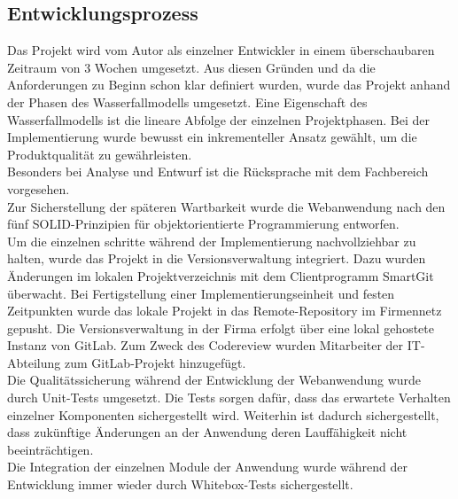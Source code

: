 \subsection{Entwicklungsprozess}
\label{sec:Entwicklungsprozess}
Das Projekt wird vom Autor als einzelner Entwickler in einem überschaubaren Zeitraum 
von 3 Wochen umgesetzt. Aus diesen Gründen und da die Anforderungen zu Beginn schon
klar definiert wurden, wurde das Projekt anhand der Phasen des Wasserfallmodells umgesetzt. 
Eine Eigenschaft des Wasserfallmodells ist die lineare Abfolge der einzelnen Projektphasen.
Bei der Implementierung wurde bewusst ein inkrementeller Ansatz gewählt, um die Produktqualität
zu gewährleisten.\\
Besonders bei Analyse und Entwurf ist die Rücksprache mit dem Fachbereich
vorgesehen.\\
Zur Sicherstellung der späteren Wartbarkeit wurde die Webanwendung nach den fünf SOLID-Prinzipien
für objektorientierte Programmierung entworfen.\\ 
Um die einzelnen schritte während der Implementierung nachvollziehbar zu halten,
wurde das Projekt in die Versionsverwaltung integriert.
Dazu wurden Änderungen im lokalen Projektverzeichnis mit dem Clientprogramm SmartGit überwacht.
Bei Fertigstellung einer Implementierungseinheit und festen Zeitpunkten wurde das lokale Projekt in das 
Remote-Repository im Firmennetz gepusht. Die Versionsverwaltung in der Firma erfolgt über eine lokal gehostete Instanz
von GitLab. Zum Zweck des Codereview wurden Mitarbeiter der IT-Abteilung zum GitLab-Projekt hinzugefügt.\\
Die Qualitätssicherung während der Entwicklung der Webanwendung wurde durch Unit-Tests umgesetzt. Die Tests 
sorgen dafür, dass das erwartete Verhalten einzelner Komponenten sichergestellt wird. Weiterhin ist dadurch 
sichergestellt, dass zukünftige Änderungen an der Anwendung deren Lauffähigkeit nicht beeinträchtigen.\\
Die Integration der einzelnen Module der Anwendung wurde während der Entwicklung immer wieder durch Whitebox-Tests
sichergestellt.
